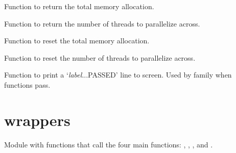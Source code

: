 \documentclass[letterpaper,10pt,english]{sphinxmanual}
\begin{document}

\begin{fulllineitems}
\label{index:util.get_memory}
Function to return the total memory allocation.

\end{fulllineitems}


\begin{fulllineitems}
\label{index:util.get_num_threads}
Function to return the number of threads to parallelize across.

\end{fulllineitems}


\begin{fulllineitems}
\label{index:util.set_memory}
Function to reset the total memory allocation.

\end{fulllineitems}


\begin{fulllineitems}
\label{index:util.set_num_threads}
Function to reset the number of threads to parallelize across.

\end{fulllineitems}


\begin{fulllineitems}
\label{index:util.success}
Function to print a `\emph{label}...PASSED' line to screen.
Used by {\hyperref[index:util.compare_values]{}} family when functions pass.

\end{fulllineitems}



\section{wrappers}
\label{index:wrappers}\label{index:module-wrappers}
Module with functions that call the four main {\hyperref[index:module-driver]{}}
functions: {\hyperref[index:driver.energy]{}}, ,
{\hyperref[index:driver.response]{}}, and {\hyperref[index:driver.frequency]{}}.
\end{document}
